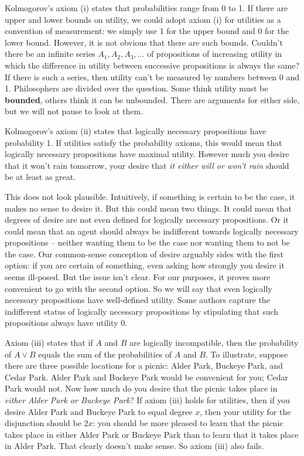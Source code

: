 Kolmogorov's axiom (i) states that probabilities range from 0 to 1. If
there are upper and lower bounds on utility, we could adopt axiom (i)
for utilities as a convention of measurement: we simply use 1 for the
upper bound and 0 for the lower bound. However, it is not obvious that there
are such bounds. Couldn't there be an infinite series $A_1, A_2, A_3,
\ldots$ of propositions of increasing utility in which the difference
in utility between successive propositions is always the same? If
there is such a series, then utility can't be measured by numbers
between 0 and 1. Philosophers are divided over the question. Some
think utility must be \textbf{bounded}, others think it can be
unbounded. There are arguments for either side, but we will not pause
to look at them.

Kolmogorov's axiom (ii) states that logically necessary propositions
have probability 1. If utilities satisfy the probability axioms, this
would mean that logically necessary propositions have maximal
utility. However much you desire that it won't rain tomorrow, your
desire that \emph{it either will or won't rain} should be at least as
great.

This does not look plausible. Intuitively, if something is certain to be the
case, it makes no sense to desire it. But this could mean two things. It could
mean that degrees of desire are not even defined for logically necessary
propositions. Or it could mean that an agent should always be indifferent
towards logically necessary propositions -- neither wanting them to be the case
nor wanting them to not be the case. Our common-sense conception of desire
arguably sides with the first option: if you are certain of something, even
asking how strongly you desire it seems ill-posed. But the issue isn't clear.
For our purposes, it proves more convenient to go with the second option. So we
will say that even logically necessary propositions have well-defined utility.
Some authors capture the indifferent status of logically necessary propositions
by stipulating that such propositions always have utility 0.

Axiom (iii) states that if $A$ and $B$ are logically incompatible,
then the probability of $A\lor B$ equals the sum of the probabilities
of $A$ and $B$. To illustrate, suppose there are three possible
locations for a picnic: Alder Park, Buckeye Park, and Cedar Park.
Alder Park and Buckeye Park would be convenient for you; Cedar Park
would not. Now how much do you desire that the picnic takes place in
\emph{either Alder Park or Buckeye Park}? If axiom (iii) holds for
utilities, then if you desire Alder Park and Buckeye Park to equal
degree $x$, then your utility for the disjunction should be $2x$: you
should be more pleased to learn that the picnic takes place in either
Alder Park or Buckeye Park than to learn that it takes place in Alder
Park. That clearly doesn't make sense. So axiom (iii) also fails.


